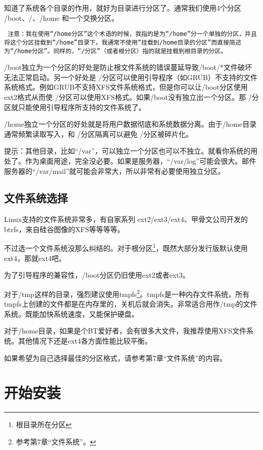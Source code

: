 \documentclass[amstex]{ctexbook}
\newenvironment{notice}{\tt}{}
\begin{document}
知道了系统各个目录的作用，就好为目录进行分区了。通常我们使用4个分区 /boot、/、/home 和一个交换分区。

\begin{notice}
注意：我在使用“/home分区”这个术语的时候，我指的是为“/home”分一个单独的分区，并且将这个分区挂载到“/home”目录下。我通常不使用“挂载到/home目录的分区”而直接简述为“/home分区”。同样的，“/分区”（或者根分区）指的就是挂载到根目录的分区。
\end{notice}

/boot独立为一个分区的好处是防止根文件系统的错误蔓延导致/boot/*文件破坏无法正常启动。另一个好处是 /分区可以使用引导程序（如GRUB）不支持的文件系统格式。例如GRUB不支持XFS文件系统格式，但是你可以让/boot分区使用ext2格式从而使 /分区可以使用XFS格式。如果/boot没有独立出一个分区。那 /分区就只能使用引导程序所支持的文件系统了。

/home独立一个分区的好处就是将用户数据彻底和系统数据分离。由于/home目录通常频繁读取写入，和 /分区隔离可以避免 /分区被碎片化。

提示：其他目录，比如“/var”，可以独立一个分区也可以不独立。就看你系统的用处了。作为桌面用途，完全没必要。如果是服务器，“/var/log”可能会很大。邮件服务器的“/var/mail”就可能会非常大，所以非常有必要使用独立分区。

\subsection{文件系统选择}


Linux支持的文件系统非常多，有自家系列 ext2/ext3/ext4、甲骨文公司开发的btrfs，来自硅谷图像的XFS等等等等。

不过选一个文件系统没那么纠结的。对于根分区\footnote{根目录所在分区}，既然大部分发行版默认使用ext4，那就ext4吧。

为了引导程序的兼容性，/boot分区仍旧使用ext2或者ext3。

对于/tmp这样的目录，强烈建议使用tmpfs\footnote{参考第7章“文件系统”。}。tmpfs是一种内存文件系统，所有tmpfs上创建的文件都是在内存里的，关机后就会消失。非常适合用作/tmp的文件系统。既能加快系统速度，又能保护硬盘。

对于/home目录，如果是个BT爱好者，会有很多大文件，我推荐使用XFS文件系统。其他情况下还是ext4各方面性能比较平衡。

如果希望为自己选择最佳的分区格式，请参考第7章“文件系统”的内容。

\section{开始安装}
\end{document}
